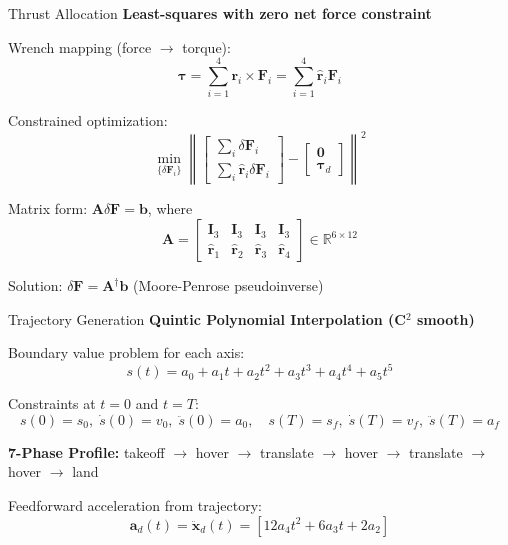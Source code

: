 \documentclass{beamer}
\begin{document}
\begin{frame}{Thrust Allocation}
\textbf{Least-squares with zero net force constraint}

Wrench mapping (force $\to$ torque):
\[
\boldsymbol{\tau} = \sum_{i=1}^{4} \mathbf{r}_i \times \mathbf{F}_i = \sum_{i=1}^{4} \widehat{\mathbf{r}}_i \mathbf{F}_i
\]

Constrained optimization:
\[
\min_{\{\delta\mathbf{F}_i\}} \left\|\begin{bmatrix} \sum_i \delta\mathbf{F}_i \\ \sum_i \widehat{\mathbf{r}}_i \delta\mathbf{F}_i \end{bmatrix} - \begin{bmatrix} \mathbf{0} \\ \boldsymbol{\tau}_d \end{bmatrix}\right\|^2
\]

Matrix form: $\mathbf{A} \delta\mathbf{F} = \mathbf{b}$, where
\[
\mathbf{A} = \begin{bmatrix} \mathbf{I}_3 & \mathbf{I}_3 & \mathbf{I}_3 & \mathbf{I}_3 \\ \widehat{\mathbf{r}}_1 & \widehat{\mathbf{r}}_2 & \widehat{\mathbf{r}}_3 & \widehat{\mathbf{r}}_4 \end{bmatrix} \in \mathbb{R}^{6 \times 12}
\]

Solution: $\delta\mathbf{F} = \mathbf{A}^\dagger \mathbf{b}$ (Moore-Penrose pseudoinverse)
\end{frame}

\begin{frame}{Trajectory Generation}
\textbf{Quintic Polynomial Interpolation (C$^2$ smooth)}

Boundary value problem for each axis:
\[
s(t) = a_0 + a_1 t + a_2 t^2 + a_3 t^3 + a_4 t^4 + a_5 t^5
\]

Constraints at $t=0$ and $t=T$:
\[
s(0) = s_0, \; \dot{s}(0) = v_0, \; \ddot{s}(0) = a_0, \quad s(T) = s_f, \; \dot{s}(T) = v_f, \; \ddot{s}(T) = a_f
\]

\textbf{7-Phase Profile:} takeoff $\to$ hover $\to$ translate $\to$ hover $\to$ translate $\to$ hover $\to$ land

Feedforward acceleration from trajectory:
\[
\mathbf{a}_d(t) = \ddot{\mathbf{x}}_d(t) = [12a_4 t^2 + 6a_3 t + 2a_2]
\]
\end{frame}
\end{document}
